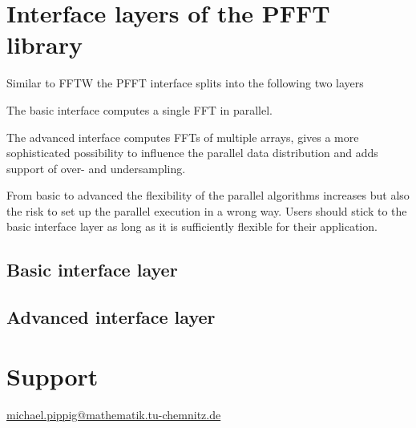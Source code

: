 \chapter{Interface layers of the PFFT library}\label{chap:api}

Similar to FFTW the PFFT interface splits into the following two layers
\begin{compactitem}
  \item The basic interface computes a single FFT in parallel.
  \item The advanced interface computes FFTs of multiple arrays, gives a more sophisticated possibility
        to influence the parallel data distribution and adds support of over- and undersampling.
\end{compactitem}
From basic to advanced the flexibility of the parallel algorithms increases but also the risk to set up the
parallel execution in a wrong way. Users should stick to the basic interface layer as long as it is sufficiently
flexible for their application.

\section{Basic interface layer}



\section{Advanced interface layer}

\chapter{Support}
\href{mailto:michael.pippig@mathematik.tu-chemnitz.de}{michael.pippig@mathematik.tu-chemnitz.de}
